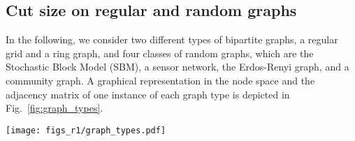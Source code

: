 \documentclass[journal]{IEEEtran}
\begin{document}
\subsection{Cut size on regular and random graphs}

In the following, we consider two different types of bipartite graphs, a regular grid and a ring graph, and four classes of random graphs, which are the Stochastic Block Model (SBM), a sensor network, the Erdos-Renyi graph, and a community graph. 
A graphical representation in the node space and the adjacency matrix of one instance of each graph type is depicted in Fig.~\ref{fig:graph_types}.

\begin{figure*}[!ht]
    \centering
    \texttt{[image: figs\_r1/graph\_types.pdf]} 
    \caption{Graphical representation and adjacency matrix of 2 regular graphs (\textit{Regular grid} and \textit{Ring}) and an instance of 4 random graphs (\textit{Stochastic Block Model (SBM)}, \textit{Sensor network}, \textit{Erdos-Renyi graph}, and \textit{Community graph}).}
    \label{fig:graph_types}
\end{figure*}
\end{document}
